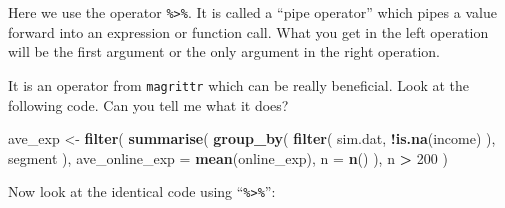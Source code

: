 \documentclass[12pt,]{krantz}
\makeatletter
\newenvironment{Shaded}{\begin{snugshade}}{\end{snugshade}}
\newcommand{\DataTypeTok}[1]{\textcolor[rgb]{0.27,0.27,0.27}{#1}}
\newcommand{\DecValTok}[1]{\textcolor[rgb]{0.06,0.06,0.06}{#1}}
\newcommand{\KeywordTok}[1]{\textcolor[rgb]{0.27,0.27,0.27}{\textbf{#1}}}
\newcommand{\NormalTok}[1]{#1}
\newcommand{\OperatorTok}[1]{\textcolor[rgb]{0.43,0.43,0.43}{\textbf{#1}}}
\newcommand{\StringTok}[1]{\textcolor[rgb]{0.5,0.5,0.5}{#1}}
\newenvironment{kframe}{%
\medskip{}
\setlength{\fboxsep}{.8em}
 \def\at@end@of@kframe{}%
 \ifinner\ifhmode%
  \def\at@end@of@kframe{\end{minipage}}%
  \begin{minipage}{\columnwidth}%
 \fi\fi%
 \def\FrameCommand##1{\hskip\@totalleftmargin \hskip-\fboxsep
 \colorbox{shadecolor}{##1}\hskip-\fboxsep
     \hskip-\linewidth \hskip-\@totalleftmargin \hskip\columnwidth}%
 \MakeFramed {\advance\hsize-\width
   \@totalleftmargin\z@ \linewidth\hsize
   \@setminipage}}%
 {\par\unskip\endMakeFramed%
 \at@end@of@kframe}
\renewenvironment{Shaded}{\begin{kframe}}{\end{kframe}}
\makeatother
\begin{document}
Here we use the operator \texttt{\%\textgreater{}\%}. It is called a ``pipe operator'' which pipes a value forward into an expression or function call. What you get in the left operation will be the first argument or the only argument in the right operation.

\begin{Shaded}
\end{Shaded}

It is an operator from \texttt{magrittr} which can be really beneficial. Look at the following code. Can you tell me what it does?

\begin{Shaded}
\begin{Highlighting}[]
\NormalTok{ave_exp <-}\StringTok{ }\KeywordTok{filter}\NormalTok{( }
  \KeywordTok{summarise}\NormalTok{(}
    \KeywordTok{group_by}\NormalTok{( }
      \KeywordTok{filter}\NormalTok{(}
\NormalTok{        sim.dat, }
        \OperatorTok{!}\KeywordTok{is.na}\NormalTok{(income)}
\NormalTok{      ), }
\NormalTok{      segment}
\NormalTok{    ), }
    \DataTypeTok{ave_online_exp =} \KeywordTok{mean}\NormalTok{(online_exp), }
    \DataTypeTok{n =} \KeywordTok{n}\NormalTok{()}
\NormalTok{  ), }
\NormalTok{  n }\OperatorTok{>}\StringTok{ }\DecValTok{200}
\NormalTok{) }
\end{Highlighting}
\end{Shaded}

Now look at the identical code using ``\texttt{\%\textgreater{}\%}'':

\begin{Shaded}
\end{Shaded}
\end{document}
